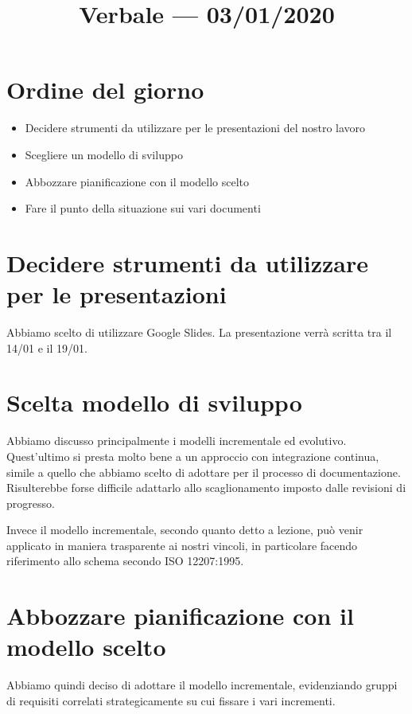 \documentclass{article}
\title{Verbale --- 03/01/2020}
\begin{document}


\section{Ordine del giorno}%
\label{sec:ordine_del_giorno}

\begin{itemize}
  \item Decidere strumenti da utilizzare per le presentazioni del nostro lavoro
  \item Scegliere un modello di sviluppo
  \item Abbozzare pianificazione con il modello scelto
  \item Fare il punto della situazione sui vari documenti
\end{itemize}

\section{Decidere strumenti da utilizzare per le presentazioni}%
\label{sec:decidere_strumenti_da_utilizzare_per_le_presentazioni}

Abbiamo scelto di utilizzare Google Slides. La presentazione verrà scritta tra il 14/01 e il 19/01.

\section{Scelta modello di sviluppo}%
\label{sec:scelta_modello_di_sviluppo}

Abbiamo discusso principalmente i modelli incrementale ed evolutivo.
Quest'ultimo si presta molto bene a un approccio con integrazione continua, simile a quello che abbiamo scelto di adottare per il processo di documentazione.
Risulterebbe forse difficile adattarlo allo scaglionamento imposto dalle revisioni di progresso.

Invece il modello incrementale, secondo quanto detto a lezione, può venir applicato in maniera trasparente ai nostri vincoli, in particolare facendo riferimento allo schema secondo ISO 12207:1995.

\section{Abbozzare pianificazione con il modello scelto}%
\label{sec:abbozzare_pianificazione_con_il_modello_scelto}

Abbiamo quindi deciso di adottare il modello incrementale, evidenziando gruppi di requisiti correlati strategicamente su cui fissare i vari incrementi.
\end{document}
